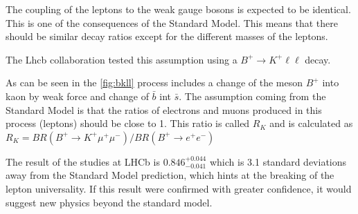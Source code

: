 The coupling of the leptons to the weak gauge bosons is expected to be identical. This is one of the consequences of the Standard Model.
This means that there should be similar decay ratios except for the different masses of the leptons.

The Lhcb collaboration tested this assumption using a $B^{+} \rightarrow  K^{+}\ell \ell $ decay.

As can be seen in the \ref{fig:bkll} process includes a change of the meson $B^{+}$ into kaon by weak force and change of $\bar{b}$ int $\bar{s}$.
The assumption coming from the Standard Model is that the ratios of electrons and muons produced in this process (leptons) should be close to 1. This ratio is called $R_{K}$ and is calculated as $R_{K} = BR(B^{+}\rightarrow K^{+}\mu^{+}\mu^{-})/BR(B^{+}\rightarrow e^{+}e^{-})$


The result of the studies at LHCb is $0.846^{+0.044}_{-0.041}$ \cite{lhcbcollaboration2021test} which is 3.1 standard deviations away from the Standard Model prediction, which hints at the breaking of the lepton universality.
If this result were confirmed with greater confidence, it would suggest new physics beyond the standard model.
